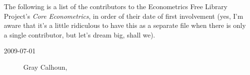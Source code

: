 

\noindent%
The following is a list of the contributors to the Econometrics Free
Library Project's \textit{Core Econometrics}, in order of
their date of first involvement (yes, I'm aware that it's a little
ridiculous to have this as a separate file when there is only a single
contributor, but let's dream big, shall we).

\begin{description}
\item[2009-07-01] Gray Calhoun, 
\end{description}

